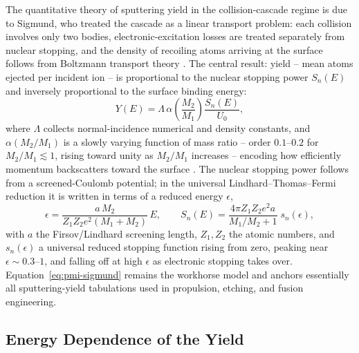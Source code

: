 The quantitative theory of sputtering yield in the collision-cascade regime is due to Sigmund, who treated the cascade as a linear transport problem: each collision involves only two bodies, electronic-excitation losses are treated separately from nuclear stopping, and the density of recoiling atoms arriving at the surface follows from Boltzmann transport theory \cite{ref0143,ref0144}. The central result: yield -- mean atoms ejected per incident ion -- is proportional to the nuclear stopping power $S_n(E)$ and inversely proportional to the surface binding energy:
\begin{equation}
Y(E) = \Lambda \,\alpha\!\left(\frac{M_2}{M_1}\right) \frac{S_n(E)}{U_0},
\label{eq:pmi-sigmund}
\end{equation}
where $\Lambda$ collects normal-incidence numerical and density constants, and $\alpha(M_2/M_1)$ is a slowly varying function of mass ratio -- order $0.1$--$0.2$ for $M_2/M_1 \lesssim 1$, rising toward unity as $M_2/M_1$ increases -- encoding how efficiently momentum backscatters toward the surface \cite{ref0143}. The nuclear stopping power follows from a screened-Coulomb potential; in the universal Lindhard--Thomas--Fermi reduction it is written in terms of a reduced energy $\epsilon$,
\begin{equation}
\epsilon = \frac{a\,M_2}{Z_1 Z_2 e^2 (M_1+M_2)}\,E, \qquad
S_n(E) = \frac{4\pi Z_1 Z_2 e^2 a}{M_1/M_2+1}\; s_n(\epsilon),
\label{eq:pmi-stoppingpower}
\end{equation}
with $a$ the Firsov/Lindhard screening length, $Z_1,Z_2$ the atomic numbers, and $s_n(\epsilon)$ a universal reduced stopping function rising from zero, peaking near $\epsilon\sim0.3$--$1$, and falling off at high $\epsilon$ as electronic stopping takes over. Equation~\eqref{eq:pmi-sigmund} remains the workhorse model and anchors essentially all sputtering-yield tabulations used in propulsion, etching, and fusion engineering.

\subsection{Energy Dependence of the Yield}

